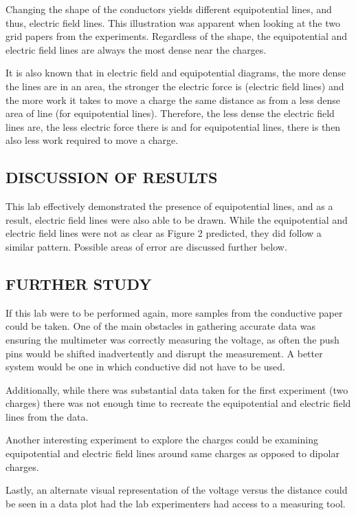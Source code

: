 \documentclass [12pt, letterpaper, twoside] {article}
\begin{document}
Changing the shape of the conductors yields different equipotential lines, and thus, electric field lines. This illustration was apparent when looking at the two grid papers from the experiments. Regardless of the shape, the equipotential and electric field lines are always the most dense near the charges.

It is also known that in electric field and equipotential diagrams, the more dense the lines are in an area, the stronger the electric force is (electric field lines) and the more work it takes to move a charge the same distance as from a less dense area of line (for equipotential lines). Therefore, the less dense the electric field lines are, the less electric force there is and for equipotential lines, there is then also less work required to move a charge.

\subsection* {DISCUSSION OF RESULTS}
This lab effectively demonstrated the presence of equipotential lines, and as a result, electric field lines were also able to be drawn. While the equipotential and electric field lines were not as clear as Figure 2 predicted, they did follow a similar pattern. Possible areas of error are discussed further below.

\subsection* {FURTHER STUDY}
If this lab were to be performed again, more samples from the conductive paper could be taken. One of the main obstacles in gathering accurate data was ensuring the multimeter was correctly measuring the voltage, as often the push pins would be shifted inadvertently and disrupt the measurement. A better system would be one in which conductive did not have to be used.

Additionally, while there was substantial data taken for the first experiment (two charges) there was not enough time to recreate the equipotential and electric field lines from the data.

Another interesting experiment to explore the charges could be examining equipotential and electric field lines around same charges as opposed to dipolar charges.

Lastly, an alternate visual representation of the voltage versus the distance could be seen in a data plot had the lab experimenters had access to a measuring tool.
\end{document}
